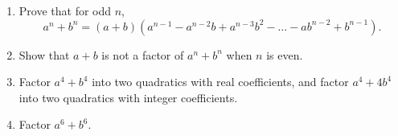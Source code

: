 \begin{enumerate}
\item[(a)] Prove that for odd $n$,
\[a^n+b^n=(a+b)\left(a^{n-1}-a^{n-2}b+a^{n-3}b^2-\dots-ab^{n-2}+b^{n-1}\right).\]
\item[(b)] Show that $a+b$ is not a factor of $a^n+b^n$ when $n$ is even.
\item[(c)] Factor $a^4+b^4$ into two quadratics with real coefficients, and factor $a^4+4b^4$ into two quadratics with integer coefficients.
\item[(d)] Factor $a^6+b^6$.
\end{enumerate}
